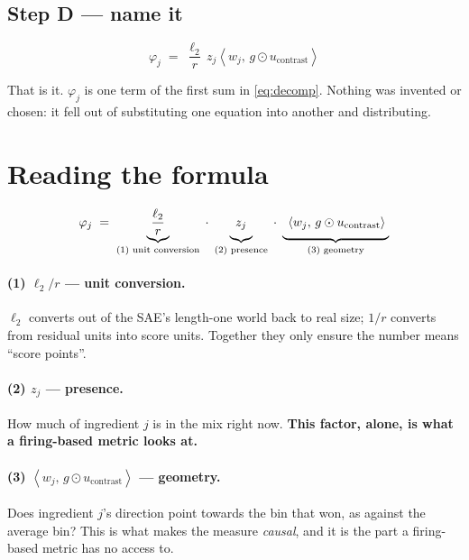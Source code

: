 \documentclass[11pt]{article}
\newcommand{\dotp}[2]{\left\langle #1,\, #2 \right\rangle}
\newcommand{\ucon}{u_{\mathrm{contrast}}}
\begin{document}
\subsection*{Step D --- name it}

\begin{equation}
\boxed{\;\varphi_j \;=\; \frac{\ell_2}{r}\, z_j \dotp{w_j}{g \odot \ucon}\;}
\label{eq:phi}
\end{equation}

That is it. $\varphi_j$ is one term of the first sum in \eqref{eq:decomp}. Nothing was invented
or chosen: it fell out of substituting one equation into another and distributing.

\section{Reading the formula}
\label{sec:reading}

\begin{equation*}
\varphi_j \;=\;
\underbrace{\frac{\ell_2}{r}}_{\text{(1) unit conversion}}
\;\cdot\;
\underbrace{\vphantom{\frac{\ell_2}{r}}\; z_j \;}_{\text{(2) presence}}
\;\cdot\;
\underbrace{\vphantom{\frac{\ell_2}{r}}\; \dotp{w_j}{g \odot \ucon} \;}_{\text{(3) geometry}}
\end{equation*}

\paragraph{(1) $\ell_2/r$ --- unit conversion.} $\ell_2$ converts out of the SAE's
length-one world back to real size; $1/r$ converts from residual units into score units.
Together they only ensure the number means ``score points''.

\paragraph{(2) $z_j$ --- presence.} How much of ingredient $j$ is in the mix right now.
\textbf{This factor, alone, is what a firing-based metric looks at.}

\paragraph{(3) $\dotp{w_j}{g \odot \ucon}$ --- geometry.} Does ingredient $j$'s direction point
towards the bin that won, as against the average bin? This is what makes the measure
\emph{causal}, and it is the part a firing-based metric has no access to.
\end{document}
